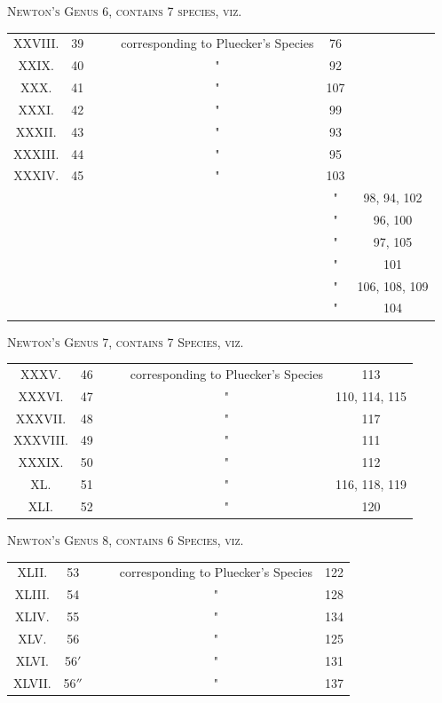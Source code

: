 \documentclass[11pt,a4paper]{article}
\theoremstyle{plain}
\begin{document}
\begin{center}
\textsc{Newton's Genus 6, contains 7 species, viz.}
\end{center}
\begin{center}
\begin{tabular}{ccccccc}
\toprule
XXVIII. & 39 & & & corresponding to Pluecker's Species & 76 \\
XXIX. & 40 & & & " & 92 \\
XXX. & 41 & & & " & 107 \\
XXXI. & 42 & & & " & 99 \\
XXXII. & 43 & & & " & 93 \\
XXXIII. & 44 & & & " & 95 \\
XXXIV. & 45 & & & " & 103 \\
  & & & & & " & 98, 94, 102 \\
  & & & & & " & 96, 100 \\
  & & & & & " & 97, 105 \\
  & & & & & " & 101 \\
  & & & & & " & 106, 108, 109 \\
  & & & & & " & 104 \\
\bottomrule
\end{tabular}
\end{center}

\begin{center}
\textsc{Newton's Genus 7, contains 7 Species, viz.}
\end{center}
\begin{center}
\begin{tabular}{cccccc}
\toprule
XXXV. & 46 & & & corresponding to Pluecker's Species & 113 \\
XXXVI. & 47 & & & " & 110, 114, 115 \\
XXXVII. & 48 & & & " & 117 \\
XXXVIII. & 49 & & & " & 111 \\
XXXIX. & 50 & & & " & 112 \\
XL. & 51 & & & " & 116, 118, 119 \\
XLI. & 52 & & & " & 120 \\
\bottomrule
\end{tabular}
\end{center}

\begin{center}
\textsc{Newton's Genus 8, contains 6 Species, viz.}
\end{center}
\begin{center}
\begin{tabular}{cccccc}
\toprule
XLII. & 53 & & & corresponding to Pluecker's Species & 122 \\
XLIII. & 54 & & & " & 128 \\
XLIV. & 55 & & & " & 134 \\
XLV. & 56 & & & " & 125 \\
XLVI. & 56$'$ & & & " & 131 \\
XLVII. & 56$''$ & & & " & 137 \\
\bottomrule
\end{tabular}
\end{center}
\end{document}
